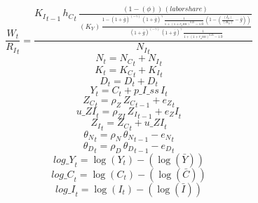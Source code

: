 \begin{dmath}
\frac{{{W}}_{t}}{{{R_I}}_{t}}=\frac{{{K_I}}_{t-1}\, {{h_C}}_{t}\, \frac{\left(1-{(\phi)}\right)\, {(labor share)}}{{(K_Y)}\, \frac{1-\left(1+{{\overline{g}}}\right)^{\left(-{{\gamma}}\right)}\, \left(1+{{\overline{g}}}\right)^{{{\gamma}}}\, \frac{1}{1+\left(1+{{r_ann}}\right)^{0.25}-1.0}\, \left(1-\left(\frac{{(I_Y)}}{{(K_Y)}}-{{\overline{g}}}\right)\right)}{\left(1+{{\overline{g}}}\right)^{\left(-{{\gamma}}\right)}\, \left(1+{{\overline{g}}}\right)^{{{\gamma}}}\, \frac{1}{1+\left(1+{{r_ann}}\right)^{0.25}-1.0}}}}{{{N_I}}_{t}}
\end{dmath}
\begin{dmath}
{{N}}_{t}={{N_C}}_{t}+{{N_I}}_{t}
\end{dmath}
\begin{dmath}
{{K}}_{t}={{K_C}}_{t}+{{K_I}}_{t}
\end{dmath}
\begin{dmath}
{{D}}_{t}={{D}}_{t}+{{D}}_{t}
\end{dmath}
\begin{dmath}
{{Y}}_{t}={{C}}_{t}+{p\_I\_ss}\, {{I}}_{t}
\end{dmath}
\begin{dmath}
{{Z_C}}_{t}={{\rho_Z}}\, {{Z_C}}_{t-1}+{{e_Z}}_{t}
\end{dmath}
\begin{dmath}
{u\_ZI}_{t}={{\rho_{ZI}}}\, {{Z_I}}_{t-1}+{{e_ZI}}_{t}
\end{dmath}
\begin{dmath}
{{Z_I}}_{t}={{Z_C}}_{t}+{u\_ZI}_{t}
\end{dmath}
\begin{dmath}
{{\theta_N}}_{t}={{\rho_N}}\, {{\theta_N}}_{t-1}-{{e_N}}_{t}
\end{dmath}
\begin{dmath}
{{\theta_D}}_{t}={{\rho_D}}\, {{\theta_D}}_{t-1}-{{e_D}}_{t}
\end{dmath}
\begin{dmath}
{log\_Y}_{t}=\log\left({{Y}}_{t}\right)-(\log\left(\bar{{Y}}\right))
\end{dmath}
\begin{dmath}
{log\_C}_{t}=\log\left({{C}}_{t}\right)-(\log\left(\bar{{C}}\right))
\end{dmath}
\begin{dmath}
{log\_I}_{t}=\log\left({{I}}_{t}\right)-(\log\left(\bar{{I}}\right))
\end{dmath}
